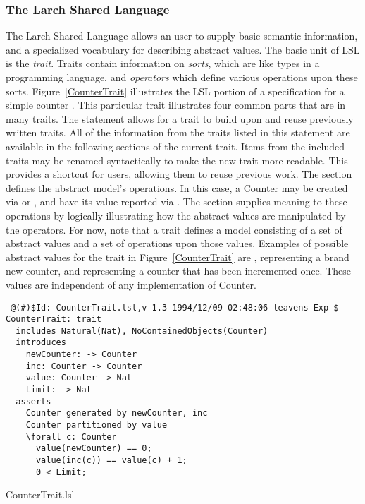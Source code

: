 \subsubsection{The Larch Shared Language}
\label{lslintro}
The Larch Shared Language \cite{Guttag-Horning93} allows an user to
supply basic semantic information, and a specialized vocabulary for
describing abstract values. The basic unit of LSL is the
\emph{trait}. Traits contain information on \emph{sorts}, which are
like types in a programming language, and \emph{operators} which define
various operations upon these sorts. Figure~\ref{CounterTrait}
illustrates the LSL portion of a specification for a simple counter
\cite{Leavens96c}. This particular trait illustrates four common
parts that are in many traits. The
 statement allows for a trait to build upon and
reuse previously written traits. All of the information from the
traits listed in this statement are available in the following
sections of the current trait. Items from the included traits may be
renamed syntactically to make the new trait more readable. This
provides a shortcut for users, allowing them to reuse previous work.
The  section defines the abstract model's
operations. In this case, a Counter may be created via
 or , and have its
value reported via . The
 section supplies meaning to these
operations by logically illustrating how the abstract values are
manipulated by the operators. For now, note that a trait defines a
model consisting of a set of abstract values and a set of operations
upon those values. Examples of possible abstract values for the trait
in Figure~\ref{CounterTrait} are , representing a
brand new counter, and  representing a
counter that has been incremented once. These values are independent
of any implementation of Counter.

\begin{BFIGURE}
\begin{verbatim}
 @(#)$Id: CounterTrait.lsl,v 1.3 1994/12/09 02:48:06 leavens Exp $
CounterTrait: trait
  includes Natural(Nat), NoContainedObjects(Counter)
  introduces
    newCounter: -> Counter
    inc: Counter -> Counter
    value: Counter -> Nat
    Limit: -> Nat
  asserts
    Counter generated by newCounter, inc
    Counter partitioned by value
    \forall c: Counter
      value(newCounter) == 0;
      value(inc(c)) == value(c) + 1;
      0 < Limit;
\end{verbatim}

\caption{CounterTrait.lsl}
\label{CounterTrait}
\end{BFIGURE}


